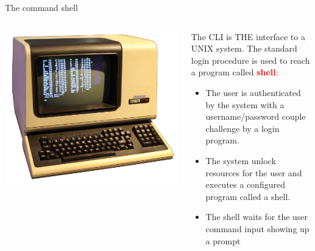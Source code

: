 \documentclass[unknownkeysallowed, 10pt, a4 paper, handout]{beamer}
\newcommand{\focus}[1]{\textbf{\textcolor{red}{#1}}}
\begin{document}
\begin{frame}[label=shell]{The command shell}
  \begin{columns}[T]
    \begin{column}{.43\textwidth}
      \begin{center}
        \includegraphics[scale=0.4]{pics/vt100.png}
      \end{center}
    \end{column}
    \hfill
    \begin{column}{.56\textwidth}
    \small{
      The CLI is THE interface to a UNIX system. The standard login
      procedure is used to reach a program called \focus{shell}:
      \begin{itemize}
        \item The user is authenticated by the system with a username/password
          couple challenge by a login program.
        \item The system unlock resources for the user and executes a
          configured program called a shell.
        \item The shell waits for the user command input showing up a prompt 
      \end{itemize}
      }
    \end{column}
  \end{columns}
\end{frame}
\end{document}
